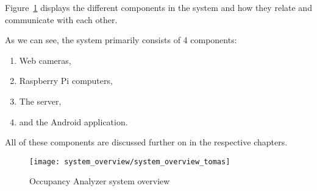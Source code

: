 Figure~\ref{fig:system_overview} displays the different components in the system and how they relate and communicate with each other.

As we can see, the system primarily consists of 4 components:

\begin{enumerate}
	\item Web cameras,
	\item Raspberry Pi computers,
	\item The server,
	\item and the Android application.
\end{enumerate}

All of these components are discussed further on in the respective chapters.
\begin{figure}[ht]
	\centering
	\texttt{[image: system\_overview/system\_overview\_tomas]}
	\caption{Occupancy Analyzer system overview}
	\label{fig:system_overview}
\end{figure}